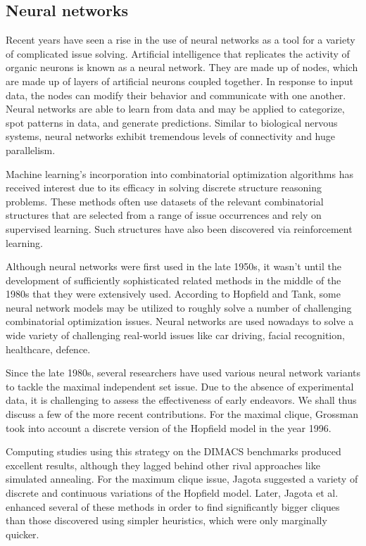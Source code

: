 \subsection{Neural networks}
Recent years have seen a rise in the use of neural networks as a tool for a variety of complicated issue solving. Artificial intelligence that replicates the activity of organic neurons is known as a neural network. They are made up of nodes, which are made up of layers of artificial neurons coupled together. In response to input data, the nodes can modify their behavior and communicate with one another. Neural networks are able to learn from data and may be applied to categorize, spot patterns in data, and generate predictions. Similar to biological nervous systems, neural networks exhibit tremendous levels of connectivity and huge parallelism.

Machine learning's incorporation into combinatorial optimization algorithms has received interest due to its efficacy in solving discrete structure reasoning problems. These methods often use datasets of the relevant combinatorial structures that are selected from a range of issue occurrences and rely on supervised learning. Such structures have also been discovered via reinforcement learning. 

Although neural networks were first used in the late 1950s, it wasn't until the development of sufficiently sophisticated related methods in the middle of the 1980s that they were extensively used. According to Hopfield and Tank, some neural network models may be utilized to roughly solve a number of challenging combinatorial optimization issues. Neural networks are used nowadays to solve a wide variety of challenging real-world issues like car driving, facial recognition, healthcare, defence.

Since the late 1980s, several researchers have used various neural network variants to tackle the maximal independent set issue. Due to the absence of experimental data, it is challenging to assess the effectiveness of early endeavors.
We shall thus discuss a few of the more recent contributions. For the maximal clique, Grossman took into account a discrete version of the Hopfield model in the year 1996.

Computing studies using this strategy on the DIMACS benchmarks produced excellent results, although they lagged behind other rival approaches like simulated annealing. For the maximum clique issue, Jagota suggested a variety of discrete and continuous variations of the Hopfield model. Later, Jagota et al. enhanced several of these methods in order to find significantly bigger cliques than those discovered using simpler heuristics, which were only marginally quicker.


